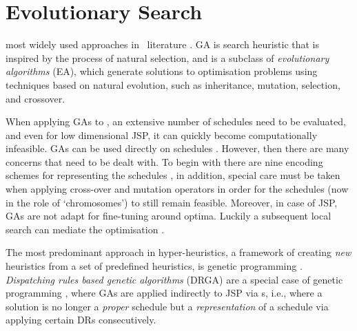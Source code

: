 

\chapter{Evolutionary Search}\label{ch:esmodels} 

 most widely used 
approaches in \JSP\ literature \citep{Pinedo08}. 
GA is search heuristic that is inspired by the process of natural selection, 
and is a subclass of \emph{evolutionary algorithms} (EA), which generate 
solutions to optimisation problems using techniques based on natural evolution, 
such as inheritance, mutation, selection, and crossover.

When applying GAs to \JSP, an extensive number of schedules need to be 
evaluated, and even for low dimensional JSP, it can quickly become 
computationally infeasible. GAs can be used directly on schedules 
\citep{Cheng96,Cheng99,Tsai07,Qing-dao-er-ji12,Ak12}. 
However, then there are many concerns that need to be dealt with. 
To begin with there are nine encoding schemes for representing the schedules 
\citep{Cheng96}, in addition, special care must be taken when applying 
cross-over and mutation operators in order for the schedules (now in the role 
of `chromosomes') to still remain feasible. 
Moreover, in case of JSP, GAs are not adapt for fine-tuning around optima. 
Luckily a subsequent local search can mediate the optimisation 
\citep{Cheng99,Meeran12}.

The most predominant approach in hyper-heuristics, a framework of creating 
\emph{new} heuristics from a set of  predefined heuristics, is genetic 
programming \citep{Burke10}. 
\emph{Dispatching rules based genetic algorithms} (DRGA) 
\citep{Vazquez-Rodriguez09,Dhingra10,Nguyen13} are a special case of genetic 
programming \citep{Koza05}, where GAs are applied indirectly to JSP via 
\dr s, i.e., where a solution is no longer a \emph{proper} schedule 
but a \emph{representation} of a schedule via applying certain DRs 
consecutively. 

